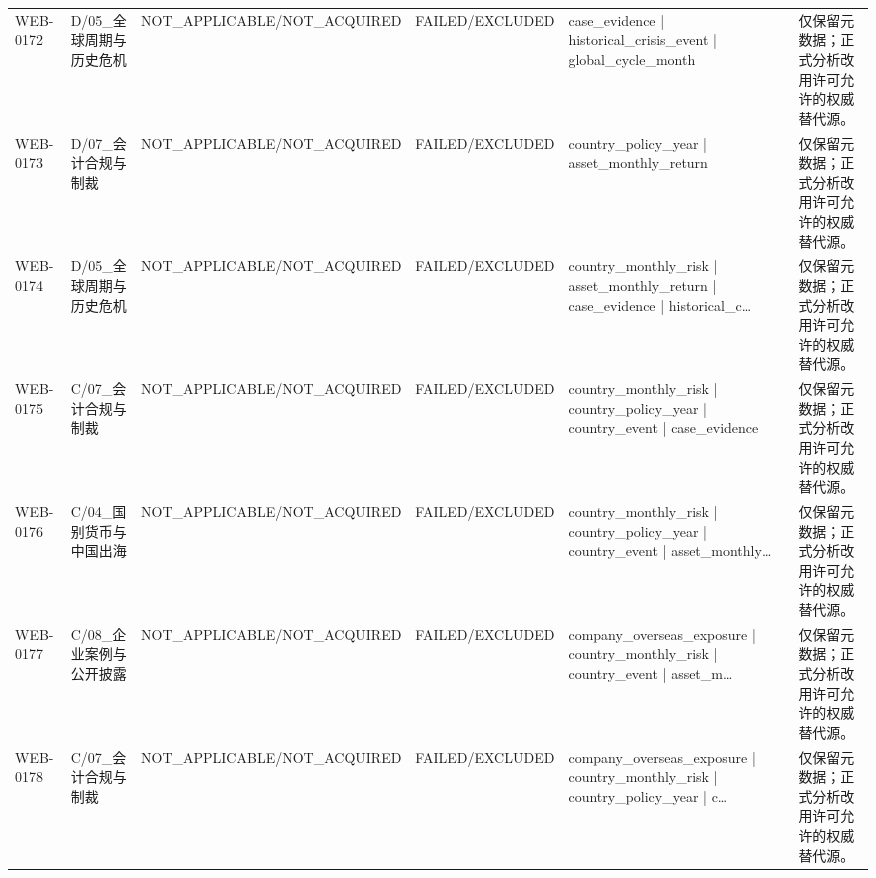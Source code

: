 \begin{landscape}
\begin{longtable}{p{1.8cm}p{2.6cm}p{2.6cm}p{2.6cm}p{4.8cm}p{7.2cm}}
WEB-0172 & D/\allowbreak{}05\_\allowbreak{}全球周期与历史危机 & NOT\_\allowbreak{}APPLICABLE/\allowbreak{}NOT\_\allowbreak{}ACQUIRED & FAILED/\allowbreak{}EXCLUDED & case\_\allowbreak{}evidence | historical\_\allowbreak{}crisis\_\allowbreak{}event | global\_\allowbreak{}cycle\_\allowbreak{}month & 仅保留元数据；正式分析改用许可允许的权威替代源。\\
WEB-0173 & D/\allowbreak{}07\_\allowbreak{}会计合规与制裁 & NOT\_\allowbreak{}APPLICABLE/\allowbreak{}NOT\_\allowbreak{}ACQUIRED & FAILED/\allowbreak{}EXCLUDED & country\_\allowbreak{}policy\_\allowbreak{}year | asset\_\allowbreak{}monthly\_\allowbreak{}return & 仅保留元数据；正式分析改用许可允许的权威替代源。\\
WEB-0174 & D/\allowbreak{}05\_\allowbreak{}全球周期与历史危机 & NOT\_\allowbreak{}APPLICABLE/\allowbreak{}NOT\_\allowbreak{}ACQUIRED & FAILED/\allowbreak{}EXCLUDED & country\_\allowbreak{}monthly\_\allowbreak{}risk | asset\_\allowbreak{}monthly\_\allowbreak{}return | case\_\allowbreak{}evidence | historical\_\allowbreak{}c… & 仅保留元数据；正式分析改用许可允许的权威替代源。\\
WEB-0175 & C/\allowbreak{}07\_\allowbreak{}会计合规与制裁 & NOT\_\allowbreak{}APPLICABLE/\allowbreak{}NOT\_\allowbreak{}ACQUIRED & FAILED/\allowbreak{}EXCLUDED & country\_\allowbreak{}monthly\_\allowbreak{}risk | country\_\allowbreak{}policy\_\allowbreak{}year | country\_\allowbreak{}event | case\_\allowbreak{}evidence & 仅保留元数据；正式分析改用许可允许的权威替代源。\\
WEB-0176 & C/\allowbreak{}04\_\allowbreak{}国别货币与中国出海 & NOT\_\allowbreak{}APPLICABLE/\allowbreak{}NOT\_\allowbreak{}ACQUIRED & FAILED/\allowbreak{}EXCLUDED & country\_\allowbreak{}monthly\_\allowbreak{}risk | country\_\allowbreak{}policy\_\allowbreak{}year | country\_\allowbreak{}event | asset\_\allowbreak{}monthly… & 仅保留元数据；正式分析改用许可允许的权威替代源。\\
WEB-0177 & C/\allowbreak{}08\_\allowbreak{}企业案例与公开披露 & NOT\_\allowbreak{}APPLICABLE/\allowbreak{}NOT\_\allowbreak{}ACQUIRED & FAILED/\allowbreak{}EXCLUDED & company\_\allowbreak{}overseas\_\allowbreak{}exposure | country\_\allowbreak{}monthly\_\allowbreak{}risk | country\_\allowbreak{}event | asset\_\allowbreak{}m… & 仅保留元数据；正式分析改用许可允许的权威替代源。\\
WEB-0178 & C/\allowbreak{}07\_\allowbreak{}会计合规与制裁 & NOT\_\allowbreak{}APPLICABLE/\allowbreak{}NOT\_\allowbreak{}ACQUIRED & FAILED/\allowbreak{}EXCLUDED & company\_\allowbreak{}overseas\_\allowbreak{}exposure | country\_\allowbreak{}monthly\_\allowbreak{}risk | country\_\allowbreak{}policy\_\allowbreak{}year | c… & 仅保留元数据；正式分析改用许可允许的权威替代源。\\

\end{longtable}
\end{landscape}
